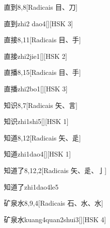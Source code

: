 \begin{entry}{直到}{8,8}[Radicais ⽬、⼑]
  \begin{phonetics}{直到}{zhi2 dao4}[][HSK 3]
  \end{phonetics}
\end{entry}

\begin{entry}{直接}{8,11}[Radicais ⽬、⼿]
  \begin{phonetics}{直接}{zhi2jie1}[][HSK 2]
  \end{phonetics}
\end{entry}

\begin{entry}{直播}{8,15}[Radicais ⽬、⼿]
  \begin{phonetics}{直播}{zhi2bo1}[][HSK 3]
  \end{phonetics}
\end{entry}

\begin{entry}{知识}{8,7}[Radicais ⽮、⾔]
  \begin{phonetics}{知识}{zhi1shi5}[][HSK 1]
  \end{phonetics}
\end{entry}

\begin{entry}{知道}{8,12}[Radicais ⽮、⾡]
  \begin{phonetics}{知道}{zhi1dao4}[][HSK 1]
  \end{phonetics}
\end{entry}

\begin{entry}{知道了}{8,12,2}[Radicais ⽮、⾡、⼅]
  \begin{phonetics}{知道了}{zhi1dao4le5}
  \end{phonetics}
\end{entry}

\begin{entry}{矿泉水}{8,9,4}[Radicais ⽯、⽔、⽔]
  \begin{phonetics}{矿泉水}{kuang4quan2shui3}[][HSK 4]
  \end{phonetics}
\end{entry}

